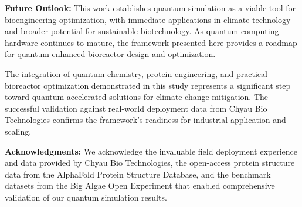 \textbf{Future Outlook:} This work establishes quantum simulation as a viable tool for bioengineering optimization, with immediate applications in climate technology and broader potential for sustainable biotechnology. As quantum computing hardware continues to mature, the framework presented here provides a roadmap for quantum-enhanced bioreactor design and optimization.

The integration of quantum chemistry, protein engineering, and practical bioreactor optimization demonstrated in this study represents a significant step toward quantum-accelerated solutions for climate change mitigation. The successful validation against real-world deployment data from Chyau Bio Technologies confirms the framework's readiness for industrial application and scaling.

\textbf{Acknowledgments:} We acknowledge the invaluable field deployment experience and data provided by Chyau Bio Technologies, the open-access protein structure data from the AlphaFold Protein Structure Database, and the benchmark datasets from the Big Algae Open Experiment that enabled comprehensive validation of our quantum simulation results.